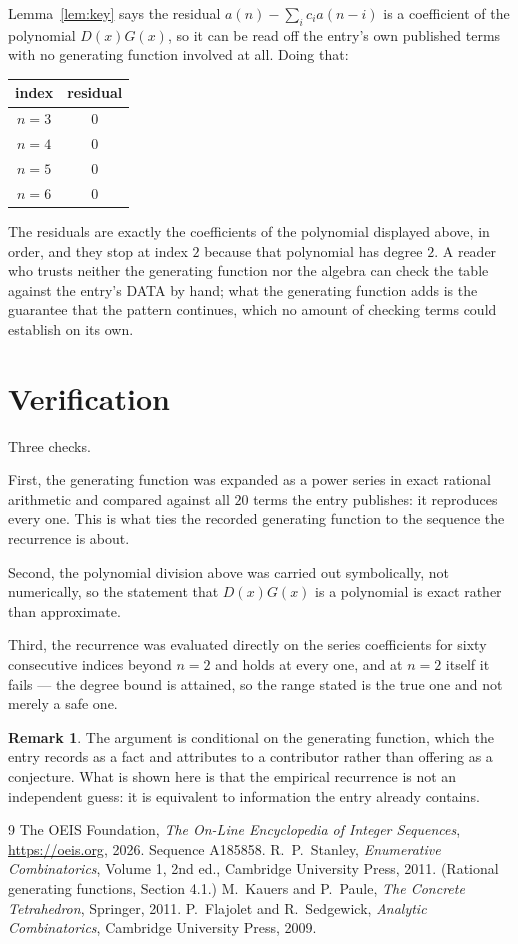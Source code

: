 \documentclass[11pt,a4paper]{article}
\theoremstyle{plain}
\theoremstyle{definition}
\newtheorem{remark}[theorem]{Remark}
\begin{document}
Lemma~\ref{lem:key} says the residual $a(n)-\sum_ic_ia(n-i)$ is a coefficient of the
polynomial $D(x)G(x)$, so it can be read off the entry's own published terms with no
generating function involved at all. Doing that:
\begin{center}
\begin{tabular}{cc}
index & residual \\ \hline
$n=3$ & $0$ \\
$n=4$ & $0$ \\
$n=5$ & $0$ \\
$n=6$ & $0$
\end{tabular}
\end{center}
The residuals are exactly the coefficients of the polynomial displayed above, in order, and
they stop at index $2$ because that polynomial has degree $2$. A reader who trusts
neither the generating function nor the algebra can check the table against the entry's DATA
by hand; what the generating function adds is the guarantee that the pattern continues, which
no amount of checking terms could establish on its own.

\section{Verification}

Three checks.

First, the generating function was expanded as a power series in exact rational arithmetic and
compared against all $20$ terms the entry publishes: it reproduces every one. This is
what ties the recorded generating function to the sequence the recurrence is about.

Second, the polynomial division above was carried out symbolically, not numerically, so the
statement that $D(x)G(x)$ is a polynomial is exact rather than approximate.

Third, the recurrence was evaluated directly on the series coefficients for sixty consecutive
indices beyond $n=2$ and holds at every one, and at $n=2$ itself it fails --- the
degree bound is attained, so the range stated is the true one and not merely a safe one.

\begin{remark}
The argument is conditional on the generating function, which the entry records as a fact and
attributes to a contributor rather than offering as a conjecture. What is shown here is that
the empirical recurrence is not an independent guess: it is equivalent to information the
entry already contains.
\end{remark}

\begin{thebibliography}{9}
 The OEIS Foundation, \emph{The On-Line Encyclopedia of Integer
Sequences}, \url{https://oeis.org}, 2026. Sequence A185858.
 R.~P.~Stanley, \emph{Enumerative Combinatorics}, Volume 1, 2nd ed.,
Cambridge University Press, 2011. (Rational generating functions, Section 4.1.)
 M.~Kauers and P.~Paule, \emph{The Concrete Tetrahedron}, Springer, 2011.
 P.~Flajolet and R.~Sedgewick, \emph{Analytic Combinatorics}, Cambridge
University Press, 2009.
\end{thebibliography}
\end{document}
